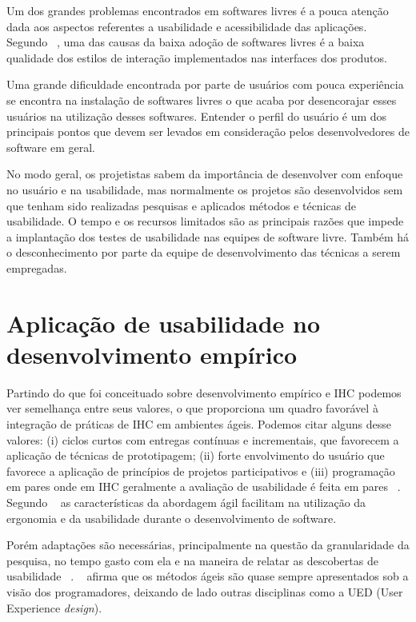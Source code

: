 Um dos grandes problemas encontrados em softwares livres é a pouca atenção dada aos aspectos referentes a usabilidade e acessibilidade das aplicações. 
%
Segundo ~, uma das causas da baixa adoção de softwares livres é a baixa qualidade dos estilos de interação implementados nas interfaces dos produtos. 

Uma grande dificuldade encontrada por parte de usuários com pouca experiência se encontra na instalação de softwares livres o que acaba por desencorajar esses usuários na utilização desses softwares. Entender o perfil do usuário é um dos principais pontos que devem ser levados em consideração pelos desenvolvedores de software em geral. 

No modo geral, os projetistas sabem da importância de desenvolver com enfoque no usuário e na usabilidade, mas normalmente os projetos são desenvolvidos sem que tenham sido realizadas pesquisas e aplicados métodos e técnicas de usabilidade.
%	
O tempo e os recursos limitados são as principais razões que impede a implantação dos testes de usabilidade nas equipes de software livre. Também há o desconhecimento por parte da equipe de desenvolvimento das técnicas a serem empregadas.
%
\section{Aplicação de usabilidade no desenvolvimento empírico}

	Partindo do que foi conceituado sobre desenvolvimento empírico e IHC podemos ver semelhança entre seus valores, o que proporciona um quadro favorável à integração de práticas de IHC em ambientes ágeis. Podemos citar alguns desse valores: (i) ciclos curtos com entregas contínuas e incrementais, que favorecem a aplicação de técnicas de prototipagem; (ii) forte envolvimento do usuário que favorece a aplicação de princípios de projetos participativos e (iii) programação em pares onde em IHC geralmente a avaliação de usabilidade é feita em pares ~\cite{barbosa2008estrategia}. 
	Segundo ~ as características da abordagem ágil facilitam na utilização da ergonomia e da usabilidade durante o desenvolvimento de software.
		
	Porém adaptações são necessárias, principalmente na questão da granularidade da pesquisa, no tempo gasto com ela e na maneira de relatar as descobertas de usabilidade ~\cite{santos2012}.
	~ afirma que os métodos ágeis são quase sempre apresentados sob a visão dos programadores, deixando de lado outras disciplinas como a UED (User Experience \emph{design}). 

